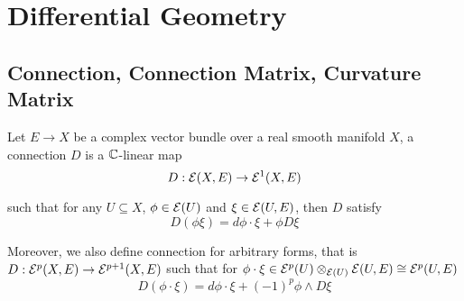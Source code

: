 \chapter{Differential Geometry}

\section{Connection, Connection Matrix, Curvature Matrix}

\begin{definition}[connection]
	Let $E \to X$ be a complex vector bundle over a real smooth manifold $X$, a connection $D$ is a $\mathbb{C}$-linear map
	$$
		D: \mathcal{E}(X, E) \to \mathcal{E}^1(X, E)
	$$
	
	such that for any $U \subseteq X$, $\phi \in \mathcal{E}(U)$ and $\xi \in \mathcal{E}(U, E)$, then $D$ satisfy
	$$
		D(\phi \xi) = d \phi \cdot \xi + \phi D \xi
	$$
	
	Moreover, we also define connection for arbitrary forms, that is $D: \mathcal{E}^p(X, E) \to \mathcal{E}^{p+1}(X, E)$ such that for $\phi \cdot \xi \in \mathcal{E}^p(U) \otimes_{\mathcal{E}(U)} \mathcal{E}(U, E) \cong \mathcal{E}^p(U, E)$
	$$
		D(\phi \cdot \xi) = d\phi \cdot \xi + (-1)^p \phi \wedge D\xi
	$$
\end{definition}

